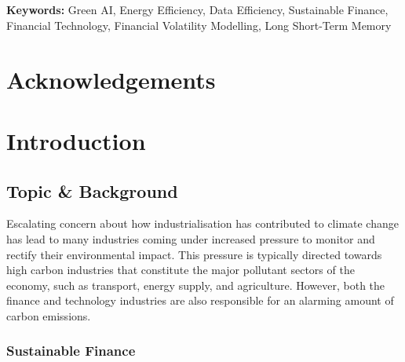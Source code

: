 \documentclass[a4paper, 11pt]{report}
\begin{document}
    \textbf{\\ \\Keywords:} Green AI, Energy Efficiency, Data Efficiency, Sustainable Finance, Financial Technology, Financial Volatility Modelling, Long Short-Term Memory


    \newpage
    \chapter*{Acknowledgements}


    \newpage
    \tableofcontents


    \newpage 
    \listoffigures


    \newpage
    \listoftables 




    \newpage
    \chapter{Introduction}
    \label{chapter: intro}

    \section{Topic \& Background}
    \label{section: topic}

    Escalating concern about how industrialisation has contributed to climate change has lead to many industries coming under increased pressure to monitor and rectify their environmental impact. This pressure is typically directed towards high carbon industries that constitute the major pollutant sectors of the economy, such as transport, energy supply, and agriculture. However, both the finance and technology industries are also responsible for an alarming amount of carbon emissions.


    \subsection{Sustainable Finance}
\end{document}
